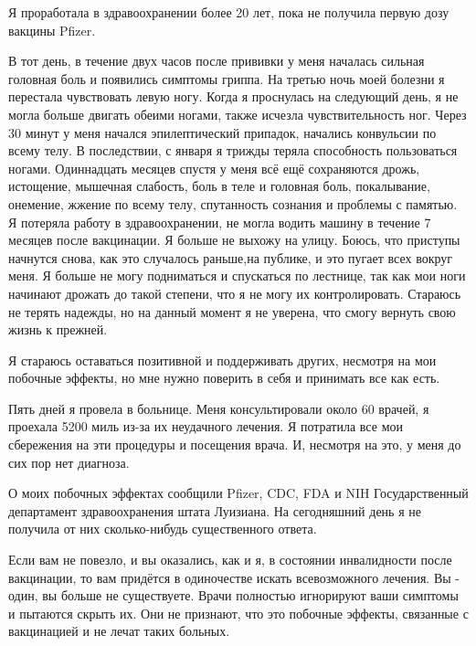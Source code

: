 Я проработала в здравоохранении более 20 лет, пока не получила первую дозу
вакцины Pfizer.

В тот день, в течение двух часов после прививки у меня началась сильная головная
боль и появились симптомы гриппа. На третью ночь моей болезни я перестала
чувствовать левую ногу. Когда я проснулась на следующий день, я не могла больше
двигать обеими ногами, также исчезла чувствительность ног. Через 30 минут у меня
начался эпилептический припадок, начались конвульсии по всему телу. В
последствии, с января я трижды теряла способность пользоваться
ногами. Одиннадцать месяцев спустя у меня всё ещё сохраняются дрожь, истощение,
мышечная слабость, боль в теле и головная боль, покалывание, онемение, жжение по
всему телу, спутанность сознания и проблемы с памятью. Я потеряла работу в
здравоохранении, не могла водить машину в течение 7 месяцев после вакцинации. Я
больше не выхожу на улицу. Боюсь, что приступы начнутся снова, как это случалось
раньше,на публике, и это пугает всех вокруг меня. Я больше не могу подниматься и
спускаться по лестнице, так как мои ноги начинают дрожать до такой степени, что
я не могу их контролировать. Стараюсь не терять надежды, но на данный момент я
не уверена, что смогу вернуть свою жизнь к прежней.

Я стараюсь оставаться позитивной и поддерживать других, несмотря на мои побочные
эффекты, но мне нужно поверить в себя и принимать все как есть.

Пять дней я провела в больнице.  Меня консультировали около 60 врачей, я
проехала 5200 миль из-за их неудачного лечения. Я потратила все мои сбережения
на эти процедуры и посещения врача.  И, несмотря на это, у меня до сих пор нет
диагноза.

О моих побочных эффектах сообщили Pfizer, CDC, FDA и NIH Государственный
департамент здравоохранения штата Луизиана. На сегодняшний день я не получила от
них сколько-нибудь существенного ответа.

Если вам не повезло, и вы оказались, как и я, в состоянии инвалидности после
вакцинации, то вам придётся в одиночестве искать всевозможного лечения. Вы -
один, вы больше не существуете. Врачи полностью игнорируют ваши симптомы и
пытаются скрыть их. Они не признают, что это побочные эффекты, связанные с
вакцинацией и не лечат таких больных.

